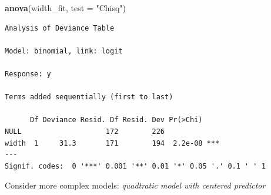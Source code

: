 \documentclass[]{book}
\newenvironment{Shaded}{\begin{snugshade}}{\end{snugshade}}
\newcommand{\DataTypeTok}[1]{\textcolor[rgb]{0.13,0.29,0.53}{#1}}
\newcommand{\DecValTok}[1]{\textcolor[rgb]{0.00,0.00,0.81}{#1}}
\newcommand{\KeywordTok}[1]{\textcolor[rgb]{0.13,0.29,0.53}{\textbf{#1}}}
\newcommand{\NormalTok}[1]{#1}
\newcommand{\OperatorTok}[1]{\textcolor[rgb]{0.81,0.36,0.00}{\textbf{#1}}}
\newcommand{\StringTok}[1]{\textcolor[rgb]{0.31,0.60,0.02}{#1}}
\begin{document}
\begin{Shaded}
\begin{Highlighting}[]
\KeywordTok{anova}\NormalTok{(width_fit, }\DataTypeTok{test =} \StringTok{"Chisq"}\NormalTok{)}
\end{Highlighting}
\end{Shaded}

\begin{verbatim}
Analysis of Deviance Table

Model: binomial, link: logit

Response: y

Terms added sequentially (first to last)

      Df Deviance Resid. Df Resid. Dev Pr(>Chi)    
NULL                    172        226             
width  1     31.3       171        194  2.2e-08 ***
---
Signif. codes:  0 '***' 0.001 '**' 0.01 '*' 0.05 '.' 0.1 ' ' 1
\end{verbatim}

Consider more complex models: \emph{quadtratic model with centered predictor}

\begin{Shaded}
\end{Shaded}

\begin{Shaded}
\end{Shaded}
\end{document}
